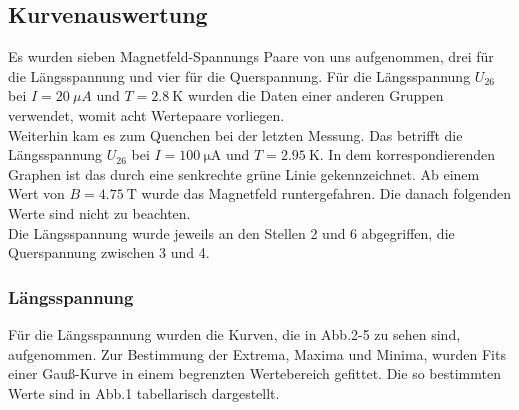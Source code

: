 \FloatBarrier
\subsection{Kurvenauswertung}

Es wurden sieben Magnetfeld-Spannungs Paare von uns aufgenommen, drei für die Längsspannung und vier für die Querspannung.  Für die Längsspannung $U_26$ bei $I = 20 \ \mu A$ und $T = 2.8 \ \mathrm{K}$ wurden die Daten einer anderen Gruppen verwendet, womit acht Wertepaare vorliegen.\\
Weiterhin kam es zum Quenchen bei der letzten Messung. Das betrifft die Längsspannung $U_{26}$ bei $I = 100 \ \mathrm{\mu A}$ und $T = 2.95 \ \mathrm{K}$. In dem korrespondierenden Graphen ist das durch eine senkrechte grüne Linie gekennzeichnet. Ab einem Wert von $B = 4.75 \ \mathrm{T}$ wurde das Magnetfeld runtergefahren. Die danach folgenden Werte sind nicht zu beachten. \\
Die Längsspannung wurde jeweils an den Stellen 2 und 6 abgegriffen, die Querspannung zwischen 3 und 4.

\subsubsection{Längsspannung}
Für die Längsspannung wurden die Kurven, die in Abb.2-5 zu sehen sind, aufgenommen. Zur Bestimmung der Extrema, Maxima und Minima, wurden Fits einer Gauß-Kurve in einem begrenzten Wertebereich gefittet. Die so bestimmten Werte sind in Abb.1 tabellarisch dargestellt.

\newpage


